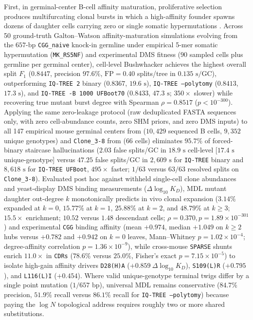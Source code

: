 \documentclass[11pt,a4paper]{article}
\begin{document}
First, in germinal-center B-cell affinity maturation, proliferative selection produces multifurcating clonal bursts in which a high-affinity founder spawns dozens of daughter cells carrying zero or single somatic hypermutations \citep{tas2016visualizing,dewitt2018gctree,dewitt2026gcreplay}. Across 50 ground-truth Galton--Watson affinity-maturation simulations evolving from the $657\text{-bp}$ \texttt{CGG\_naive} knock-in germline under empirical 5-mer somatic hypermutation (\texttt{MK\_RS5NF}) and experimental DMS fitness ($90$ sampled cells plus germline per germinal center), cell-level Bushwhacker achieves the highest overall split $F_1$ ($0.8447$, precision $97.6\%$, $\text{FP} = 0.40$ splits/tree in $0.135\text{ s/GC}$), outperforming \texttt{IQ-TREE 2} binary ($0.8367$, $19.6\text{ s}$), \texttt{IQ-TREE --polytomy} ($0.8413$, $17.3\text{ s}$), and \texttt{IQ-TREE -B 1000 UFBoot70} ($0.8433$, $47.3\text{ s}$; $350\times$ slower) while recovering true mutant burst degree with Spearman $\rho = 0.8517$ ($p < 10^{-300}$). Applying the same zero-leakage protocol (raw deduplicated FASTA sequences only, with zero cell-abundance counts, zero SHM priors, and zero DMS inputs) to all 147 empirical mouse germinal centers from \citet{dewitt2026gcreplay} ($10,429$ sequenced B cells, $9,352$ unique genotypes) and \texttt{Clone\_3-8} from \citet{tas2016visualizing} ($66$ cells) eliminates $95.7\%$ of forced-binary staircase hallucinations ($2.03$ false splits/GC in $18.9\text{ s}$ cell-level [$17.4\text{ s}$ unique-genotype] versus $47.25$ false splits/GC in $2,609\text{ s}$ for \texttt{IQ-TREE} binary and $8,618\text{ s}$ for \texttt{IQ-TREE UFBoot}, $495\times$ faster; $1/63$ versus $63/63$ resolved splits on \texttt{Clone\_3-8}). Evaluated post hoc against withheld single-cell clone abundances and yeast-display DMS binding measurements ($\Delta\log_{10} K_D$), MDL mutant daughter out-degree $k$ monotonically predicts in vivo clonal expansion ($3.14\%$ expanded at $k=0$, $15.77\%$ at $k=1$, $25.88\%$ at $k=2$, and $48.79\%$ at $k \ge 3$; $15.5\times$ enrichment; $10.52$ versus $1.48$ descendant cells; $\rho = 0.370, p = 1.89 \times 10^{-301}$) and experimental \texttt{CGG} binding affinity (mean $+0.974$, median $+1.049$ on $k \ge 2$ hubs versus $+0.782$ and $+0.942$ on $k=0$ leaves, Mann--Whitney $p = 1.02 \times 10^{-4}$; degree-affinity correlation $p = 1.36 \times 10^{-9}$), while cross-mouse \texttt{SPARSE} shunts enrich $11.0\times$ in \texttt{CDRs} ($78.6\%$ versus $25.0\%$, Fisher's exact $p = 7.15 \times 10^{-5}$) to isolate high-gain affinity drivers \texttt{D28(H)A} ($+0.859\ \Delta\log_{10} K_D$), \texttt{S109(L)R} ($+0.795$), and \texttt{L116(L)I} ($+0.454$). Where valid unique-genotype terminal twigs differ by a single point mutation ($1/657\text{ bp}$), universal MDL remains conservative ($84.7\%$ precision, $51.9\%$ recall versus $86.1\%$ recall for \texttt{IQ-TREE --polytomy}) because paying the $\log N$ topological address requires roughly two or more shared substitutions.
\end{document}

